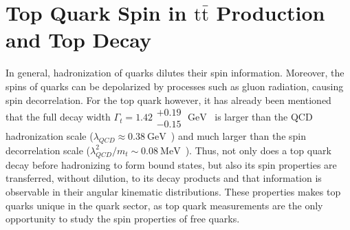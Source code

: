 \section{Top Quark Spin in \ensuremath{\mathrm{t\bar{t}}} Production and Top Decay}
In general, hadronization of quarks dilutes their spin information.
Moreover, the spins of quarks can be depolarized by processes such as gluon radiation, causing spin decorrelation.
For the top quark however, it has already been mentioned that the full decay width $\Gamma_t = 1.42 \substack{+0.19 \\ -0.15} \; \si{\GeV}$~\cite{bib:PDG} is larger than the QCD hadronization scale ($\lambda_{QCD} \approx \SI{0.38}{\GeV}$~\cite{Groote_1998}) and much larger than the spin decorrelation scale ($\lambda_{QCD}^2/m_t \sim \SI{0.08}{\MeV}$~\cite{Stelzer_1996}).
Thus, not only does a top quark decay before hadronizing to form bound states, but also its spin properties are transferred, without dilution, to its decay products and that information is observable in their angular kinematic distributions.
These properties makes top quarks unique in the quark sector, as top quark measurements are the only opportunity to study the spin properties of free quarks.

